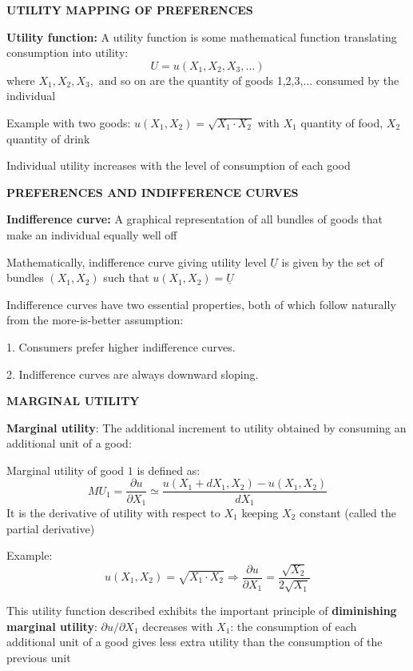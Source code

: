 \documentclass[landscape]{slides}
\begin{document}
\begin{slide}
\begin{center}
{\bf UTILITY MAPPING OF PREFERENCES}
\end{center}

\textbf{Utility function:} A utility function is some mathematical function translating consumption into utility:
$$U = u(X_1, X_2, X_3,...) $$
where $X_1, X_2, X_3,$ and so on are the quantity of goods 1,2,3,... consumed by the individual 


Example with two goods: $u(X_1,X_2) = \sqrt{X_1 \cdot X_2}$ with $X_1$ quantity of food, $X_2$ quantity of drink

Individual utility increases with the level of consumption of each good

\end{slide}



\begin{slide}
\begin{center}
{\bf PREFERENCES AND INDIFFERENCE CURVES}
\end{center}

{\bf Indifference curve:}
A graphical
representation of all bundles of goods that make an individual
equally well off

Mathematically, indifference curve giving utility level $\underline{U}$ is given by the set of bundles $(X_1,X_2)$
such that $u(X_1,X_2)=\underline{U}$

Indifference curves have two essential properties, both of which follow naturally from the more-is-better assumption:

1. Consumers prefer higher indifference curves.

2. Indifference curves are always downward sloping.
\end{slide}

\begin{slide}

\end{slide}


\begin{slide}
\begin{center}
{\bf MARGINAL UTILITY}
\end{center}

{\bf Marginal utility}:
The additional
increment to utility obtained by
consuming an additional unit of
a good:

Marginal utility of good $1$ is defined as:
\[MU_1=\frac{ \partial u}{\partial X_1} \simeq \frac{u(X_1+dX_1,X_2)- u(X_1,X_2)}{dX_1} \]
It is the derivative of utility with respect to $X_1$ keeping $X_2$ constant (called the partial derivative)

Example: \[ u(X_1,X_2) = \sqrt{X_1 \cdot X_2} \Rightarrow \frac{ \partial u}{\partial X_1}= \frac{ \sqrt {X_2}}
{ 2\sqrt{X_1}} \]

This utility function described exhibits the important principle of \textbf{diminishing marginal utility}: $\partial u/ \partial X_1$ decreases with $X_1$: the consumption of each additional unit of a good gives less extra utility than the consumption of the previous unit
\end{slide}
\end{document}
